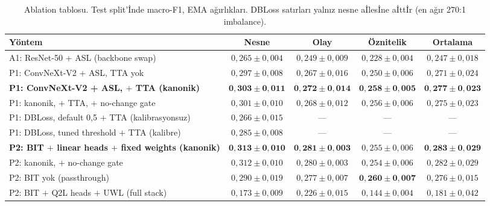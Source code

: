 \begin{table}[t]
  \caption{Ablation tablosu. Test split'{\footnotesize İ}nde macro-F1,
    EMA ağırlıkları. DBLoss satırları yalnız nesne
    a{\footnotesize İ}les{\footnotesize İ}ne a{\footnotesize İ}tt{\footnotesize İ}r
    (en ağır 270:1 imbalance).}
  \label{tab:ablation}
  \centering
  \begin{tabular}{lcccc}
    \toprule
    Yöntem & Nesne & Olay & Öznitelik & Ortalama \\
    \midrule
    A1: ResNet-50 + ASL (backbone swap)                   & $0{,}265 \pm 0{,}004$ & $0{,}249 \pm 0{,}009$ & $0{,}228 \pm 0{,}004$ & $0{,}247 \pm 0{,}018$ \\
    P1: ConvNeXt-V2 + ASL, TTA yok                        & $0{,}297 \pm 0{,}008$ & $0{,}267 \pm 0{,}016$ & $0{,}250 \pm 0{,}006$ & $0{,}271 \pm 0{,}024$ \\
    \textbf{P1: ConvNeXt-V2 + ASL, $+$ TTA (kanonik)}     & $\mathbf{0{,}303 \pm 0{,}011}$ & $\mathbf{0{,}272 \pm 0{,}014}$ & $\mathbf{0{,}258 \pm 0{,}005}$ & $\mathbf{0{,}277 \pm 0{,}023}$ \\
    P1: kanonik, $+$ TTA, $+$ no-change gate              & $0{,}301 \pm 0{,}010$ & $0{,}268 \pm 0{,}012$ & $0{,}256 \pm 0{,}006$ & $0{,}275 \pm 0{,}023$ \\
    P1: DBLoss, default 0{,}5 $+$ TTA (kalibrasyonsuz)    & $0{,}266 \pm 0{,}015$ & --- & --- & --- \\
    P1: DBLoss, tuned threshold $+$ TTA (kalibre)         & $0{,}285 \pm 0{,}008$ & --- & --- & --- \\
    \midrule
    \textbf{P2: BIT $+$ linear heads $+$ fixed weights (kanonik)} & $\mathbf{0{,}313 \pm 0{,}010}$ & $\mathbf{0{,}281 \pm 0{,}003}$ & $0{,}255 \pm 0{,}006$ & $\mathbf{0{,}283 \pm 0{,}029}$ \\
    P2: kanonik, $+$ no-change gate                       & $0{,}312 \pm 0{,}010$ & $0{,}280 \pm 0{,}003$ & $0{,}254 \pm 0{,}006$ & $0{,}282 \pm 0{,}029$ \\
    P2: BIT yok (passthrough)                             & $0{,}290 \pm 0{,}019$ & $0{,}277 \pm 0{,}007$ & $\mathbf{0{,}260 \pm 0{,}007}$ & $0{,}276 \pm 0{,}015$ \\
    P2: BIT $+$ Q2L heads $+$ UWL (full stack)            & $0{,}173 \pm 0{,}009$ & $0{,}226 \pm 0{,}015$ & $0{,}144 \pm 0{,}004$ & $0{,}181 \pm 0{,}042$ \\
    \bottomrule
  \end{tabular}
\end{table}